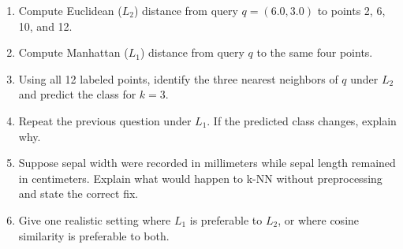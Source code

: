 \begin{enumerate}[label=\textbf{D\arabic*.}]
  \item Compute Euclidean ($L_2$) distance from query $q=(6.0,3.0)$ to points 2, 6, 10, and 12.
  \item Compute Manhattan ($L_1$) distance from query $q$ to the same four points.
  \item Using all 12 labeled points, identify the three nearest neighbors of $q$ under $L_2$ and predict the class for $k=3$.
  \item Repeat the previous question under $L_1$. If the predicted class changes, explain why.
  \item Suppose sepal width were recorded in millimeters while sepal length remained in centimeters. Explain what would happen to k-NN without preprocessing and state the correct fix.
  \item Give one realistic setting where $L_1$ is preferable to $L_2$, or where cosine similarity is preferable to both.
\end{enumerate}

